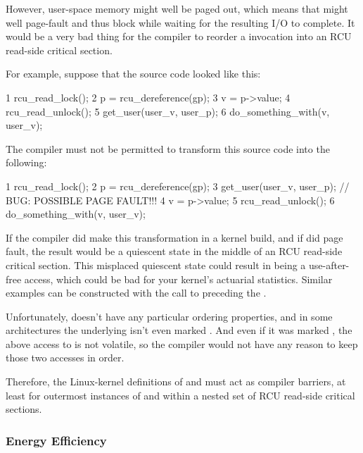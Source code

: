 However, user-space memory might well be paged out, which means that
 might well page-fault and thus block while waiting for the
resulting I/O to complete.
It would be a very bad thing for the compiler to
reorder a  invocation into an RCU read-side critical section.

For example, suppose that the source code looked like this:

\begin{VerbatimN}
       1 rcu_read_lock();
       2 p = rcu_dereference(gp);
       3 v = p->value;
       4 rcu_read_unlock();
       5 get_user(user_v, user_p);
       6 do_something_with(v, user_v);
\end{VerbatimN}

The compiler must not be permitted to transform this source code into
the following:

\begin{VerbatimN}
       1 rcu_read_lock();
       2 p = rcu_dereference(gp);
       3 get_user(user_v, user_p); // BUG: POSSIBLE PAGE FAULT!!!
       4 v = p->value;
       5 rcu_read_unlock();
       6 do_something_with(v, user_v);
\end{VerbatimN}

If the compiler did make this transformation in a  kernel
build, and if  did page fault, the result would be a quiescent
state in the middle of an RCU read-side critical section.
This misplaced
quiescent state could result in \clnref{} %
being a use-after-free access,
which could be bad for your kernel's actuarial statistics.
Similar examples
can be constructed with the call to  preceding the
.

Unfortunately,  doesn't have any particular ordering properties,
and in some architectures the underlying  isn't even marked
.
And even if it was marked , the above access to
 is not volatile, so the compiler would not have any reason to keep
those two accesses in order.

Therefore, the Linux-kernel definitions of  and
 must act as compiler barriers, at least for outermost
instances of  and  within a nested set
of RCU read-side critical sections.


\subsubsection{Energy Efficiency}

